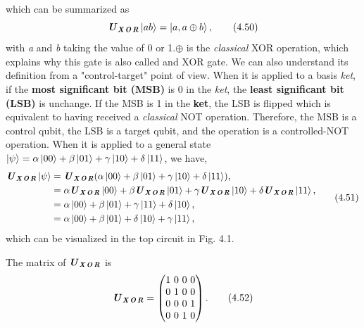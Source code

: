 \documentclass{article}
\newcommand{\bfit}[1]{\textbf{\textit{#1}}}
\begin{document}
which can be summarized as
\begin{equation} \label{eq 4.50}
    \bfit{U}_{\bfit{X\! O\! R}}\ket{ab}=\ket{a,a\oplus b},\tag{4.50}
\end{equation}
with \textit{a} and \textit{b} taking the value of 0 or 1.$\oplus$ is the \textit{classical}
XOR operation, which explains why this gate is also called and XOR gate.
We can also understand its definition from a "control-target" point of view.
When it is applied to a basis \textit{ket}, if the \textbf{most significant bit (MSB)}
is 0 in the \textit{ket}, the \textbf{least significant bit (LSB)} is unchange.
If the MSB is 1 in the \textbf{ket}, the LSB is flipped which is equivalent to
having received a \textit{classical} NOT operation. Therefore, the MSB is a control qubit,
the LSB is a target qubit, and the operation is a controlled-NOT operation. 
When it is applied to a general state $\ket{\psi}=\alpha\ket{00}+\beta\ket{01}+\gamma\ket{10}+\delta\ket{11}$,
we have,
\begin{align} \label{eq 4.51}
    \begin{split}
        \bfit{U}_{\bfit{X\! O\! R}}\ket{\psi}&=\bfit{U}_{\bfit{X\! O\! R}}(\alpha\ket{00}+\beta\ket{01}+\gamma\ket{10}+\delta\ket{11}),\\
        &= \alpha\bfit{U}_{\bfit{X\! O\! R}}\ket{00}+\beta\bfit{U}_{\bfit{X\! O\! R}}\ket{01}+\gamma\bfit{U}_{\bfit{X\! O\! R}}\ket{10}+\delta\bfit{U}_{\bfit{X\! O\! R}}\ket{11},\\
        &= \alpha\ket{00}+\beta\ket{01}+\gamma\ket{11}+\delta\ket{10},\\
        &= \alpha\ket{00}+\beta\ket{01}+\delta\ket{10}+\gamma\ket{11},\\
    \end{split}\tag{4.51}
\end{align}
which can be visualized in the top circuit in Fig. 4.1.

The matrix of $\bfit{U}_{\bfit{X\! O\! R}}$ is
\begin{equation}
    \bfit{U}_{\bfit{X\! O\! R}}=\begin{pmatrix}
        1\ 0\ 0\ 0\\0\ 1\ 0\ 0\\0\ 0\ 0\ 1\\0\ 0\ 1\ 0
    \end{pmatrix}. \tag{4.52}
\end{equation}
\end{document}
